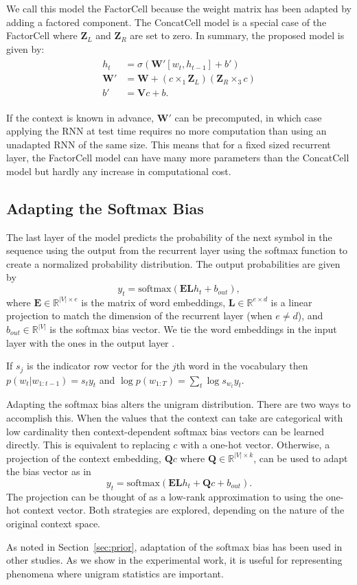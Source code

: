 We call this model the FactorCell because the weight matrix has been adapted by adding a factored component. The ConcatCell model is a special case of the FactorCell where $\mathbf{Z}_L$ and $\mathbf{Z}_R$ are set to zero. In summary, the proposed model is given by:
\begin{align}
\label{eq:FactorCell}
\begin{split}
  h_t &= \sigma( \mathbf{W}'[w_t, h_{t-1}] + b') \\
\mathbf{W}'  &=  \mathbf{W} + (c \times_1 \mathbf{Z}_L)(\mathbf{Z}_R \times_3 c)\\
 b'  &=  \mathbf{V}c + b.
\end{split}
\end{align}


If the context is known in advance, $\mathbf{W}'$ can be precomputed, in which case applying the RNN at test time requires no more computation than using an unadapted RNN of the same size. This means that for a fixed sized recurrent layer, the FactorCell model can have many more parameters than the ConcatCell model but hardly any increase in computational cost.

\subsection{Adapting the Softmax Bias}
\label{sec:softmaxbias}

The last layer of the model predicts the probability of the next symbol in the sequence using the output from the recurrent layer using the softmax function to create a normalized probability distribution. The output probabilities are given by 
\begin{equation}
y_t = \mathrm{softmax}(\mathbf{E}\mathbf{L}h_t + b_{out}),
\end{equation}
where $\mathbf{E}\in\mathbb{R}^{|V|\times e}$ is the matrix of word embeddings, $\mathbf{L}\in\mathbb{R}^{e\times d}$ is a linear projection to match the dimension of the recurrent layer (when $e\ne d$), and $b_{out} \in \mathbb{R}^{|V|}$ is the softmax bias vector. 
We tie the word embeddings in the input layer with the ones in the output layer \cite{press2016using,inan2016tying}. 

If $s_j$ is the indicator row vector for the $j$th word in the vocabulary then $p(w_t|w_{1:t-1}) = s_t y_t$ and $\log p(w_{1:T}) = \sum_t \log s_{w_t} y_t$.

Adapting the softmax bias alters the unigram distribution. There are two ways to accomplish this. When the values that the context can take are categorical with low cardinality then context-dependent softmax bias vectors can be learned directly. This is equivalent to replacing $c$ with a one-hot vector. Otherwise, a projection of the context embedding, $\mathbf{Q}c$ where $\mathbf{Q} \in \mathbb{R}^{|V| \times k}$, can be used to adapt the bias vector as in 
\begin{equation}
\label{eqn:adaptSoftmax}
y_t = \mathrm{softmax}(\mathbf{E}\mathbf{L}h_t + \mathbf{Q}c + b_{out}).
\end{equation}
The projection can be thought of as a low-rank approximation to using the one-hot context vector. Both strategies are explored,
depending on the nature of the original context space.

As noted in Section~\ref{sec:prior}, adaptation of the softmax bias has been used in other studies. As we show in the experimental work, it is useful for representing phenomena where unigram statistics are important.


